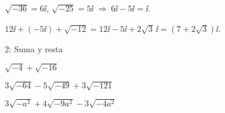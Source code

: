 
\begin{ejemplos}
  \item \(\sqrt{-36}=6\ii\), \(\sqrt{-25}=5\ii\) \(\Rightarrow\ 6\ii-5\ii=\ii\).
  \item \(12\ii+(-5\ii)+\sqrt{-12}=12\ii-5\ii+2\sqrt{3}\,\ii=(7+2\sqrt{3})\ii\).
\end{ejemplos}

\begin{actividad}{2: Suma y resta}
  \item \(\sqrt{-4}+\sqrt{-16}\)
  \item \(3\sqrt{-64}-5\sqrt{-49}+3\sqrt{-121}\)
  \item \(3\sqrt{-a^2}+4\sqrt{-9a^2}-3\sqrt{-4a^2}\)
\end{actividad}